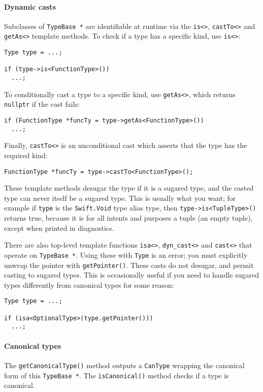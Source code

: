 \documentclass[a4paper,headsepline,bibliography=totoc,toc=flat,fleqn,twoside=semi]{scrbook}
\theoremstyle{definition}
\theoremstyle{definition}
\theoremstyle{definition}
\begin{document}
\paragraph{Dynamic casts}
Subclasses of \texttt{TypeBase *} are identifiable at runtime via the \verb|is<>|, \verb|castTo<>| and \verb|getAs<>| template methods. To check if a type has a specific kind, use \verb|is<>|:
\begin{Verbatim}
Type type = ...;

if (type->is<FunctionType>())
  ...;
\end{Verbatim}
To conditionally cast a type to a specific kind, use \verb|getAs<>|, which returns \verb|nullptr| if the cast fails:
\begin{Verbatim}
if (FunctionType *funcTy = type->getAs<FunctionType>())
  ...;
\end{Verbatim}
Finally, \verb|castTo<>| is an unconditional cast which asserts that the type has the required kind:
\begin{Verbatim}
FunctionType *funcTy = type->castTo<FunctionType>();
\end{Verbatim}
These template methods desugar the type if it is a sugared type, and the casted type can never itself be a sugared type. This is usually what you want; for example if \texttt{type} is the \texttt{Swift.Void} type alias type, then \texttt{type->is<TupleType>()} returns true, because it is for all intents and purposes a tuple (an empty tuple), except when printed in diagnostics.

There are also top-level template functions \verb|isa<>|, \verb|dyn_cast<>| and \verb|cast<>| that operate on \texttt{TypeBase *}. Using these with \texttt{Type} is an error; you must explicitly unwrap the pointer with \texttt{getPointer()}. These casts do not desugar, and permit casting to sugared types. This is occasionally useful if you need to handle sugared types differently from canonical types for some reason:
\begin{Verbatim}
Type type = ...;

if (isa<OptionalType>(type.getPointer()))
  ...;
\end{Verbatim}

\paragraph{Canonical types}
The \texttt{getCanonicalType()} method outputs a \texttt{CanType} wrapping the canonical form of this \texttt{TypeBase *}. The \texttt{isCanonical()} method checks if a type is canonical.
\end{document}
